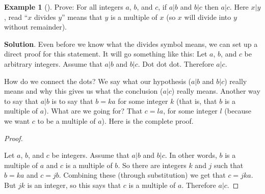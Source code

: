\documentclass[10pt,]{book}
\theoremstyle{plain}
\theoremstyle{definition}
\theoremstyle{definition}
\newtheorem{example}[theorem]{Example}
\theoremstyle{definition}
\theoremstyle{definition}
\numberwithin{equation}{chapter}
\begin{document}
\begin{example}[]\label{example-65}
\hypertarget{p-1941}{}%
Prove: For all integers \(a\), \(b\), and \(c\), if \(a|b\) and \(b|c\) then \(a|c\). Here \(x|y\), read ``\(x\) divides \(y\)'' means that \(y\) is a multiple of \(x\) (so \(x\) will divide into \(y\) without remainder).%
\par\smallskip%
\noindent\textbf{Solution}.\hypertarget{solution-180}{}\quad%
\hypertarget{p-1942}{}%
Even before we know what the divides symbol means, we can set up a direct proof for this statement. It will go something like this: Let \(a\), \(b\), and \(c\) be arbitrary integers. Assume that \(a|b\) and \(b|c\). Dot dot dot. Therefore \(a|c\).%
\par
\hypertarget{p-1943}{}%
How do we connect the dots? We say what our hypothesis (\(a|b\) and \(b|c\)) really means and why this gives us what the conclusion (\(a|c\)) really means. Another way to say that \(a|b\) is to say that \(b = ka\) for some integer \(k\) (that is, that \(b\) is a multiple of \(a\)). What are we going for? That \(c = la\), for some integer \(l\) (because we want \(c\) to be a multiple of \(a\)). Here is the complete proof.%
\begin{proof}\hypertarget{proof-22}{}
\hypertarget{p-1944}{}%
Let \(a\), \(b\), and \(c\) be integers. Assume that \(a|b\) and \(b|c\). In other words, \(b\) is a multiple of \(a\) and \(c\) is a multiple of \(b\). So there are integers \(k\) and \(j\) such that \(b = ka\) and \(c = jb\). Combining these (through substitution) we get that \(c = jka\). But \(jk\) is an integer, so this says that \(c\) is a multiple of \(a\). Therefore \(a|c\).%
\end{proof}
\end{example}
\typeout{************************************************}
\typeout{************************************************}
\end{document}
